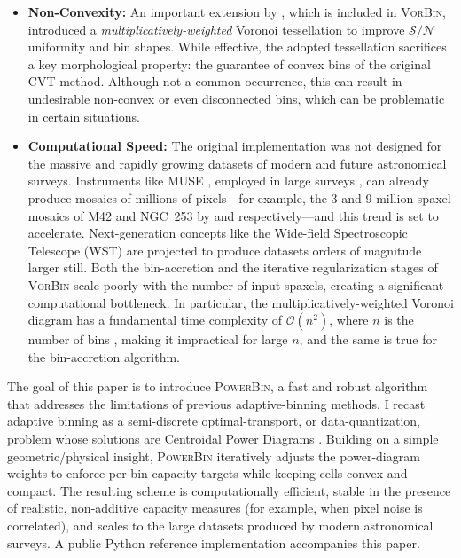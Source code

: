 \documentclass[fleqn,usenatbib]{mnras}
\newcommand{\sn}{\mathcal{S/N}}
\begin{document}
\begin{itemize}
\item \textbf{Non-Convexity:} An important extension by \citet{Diehl2006}, which is included in \textsc{VorBin}, introduced a \emph{multiplicatively-weighted} Voronoi tessellation to improve $\sn$ uniformity and bin shapes. While effective, the adopted tessellation sacrifices a key morphological property: the guarantee of convex bins of the original CVT method. Although not a common occurrence, this can result in undesirable non-convex or even disconnected bins, which can be problematic in certain situations.

\item \textbf{Computational Speed:} The original implementation was not designed for the massive and rapidly growing datasets of modern and future astronomical surveys. Instruments like MUSE \citep{Bacon2010}, employed in large surveys \citep[e.g.][]{Sarzi2018,Gadotti2019,Emsellem2022,FraserMcKelvie2025}, can already produce mosaics of millions of pixels---for example, the 3 and 9 million spaxel mosaics of M42 and NGC~253 by \citet{Weilbacher2015} and \citet{Congiu2025} respectively---and this trend is set to accelerate. Next-generation concepts like the Wide-field Spectroscopic Telescope (WST) \citep{Bacon2024} are projected to produce datasets orders of magnitude larger still. Both the bin-accretion and the iterative regularization stages of \textsc{VorBin} scale poorly with the number of input spaxels, creating a significant computational bottleneck. In particular, the multiplicatively-weighted Voronoi diagram has a fundamental time complexity of $\mathcal{O}(n^2)$, where $n$ is the number of bins \citep{Aurenhammer1984}, making it impractical for large $n$, and the same is true for the bin-accretion algorithm.

\end{itemize}  

The goal of this paper is to introduce \textsc{PowerBin}, a fast and robust algorithm that addresses the limitations of previous adaptive-binning methods. I recast adaptive binning as a semi-discrete optimal-transport, or data-quantization, problem whose solutions are Centroidal Power Diagrams \citep[CPDs,][]{Aurenhammer1987,Aurenhammer1998,Merigot2011,DeGoes2012,Levy2015}. Building on a simple geometric/physical insight, \textsc{PowerBin} iteratively adjusts the power-diagram weights to enforce per-bin capacity targets while keeping cells convex and compact. The resulting scheme is computationally efficient, stable in the presence of realistic, non-additive capacity measures (for example, when pixel noise is correlated), and scales to the large datasets produced by modern astronomical surveys. A public Python reference implementation accompanies this paper.
\end{document}
